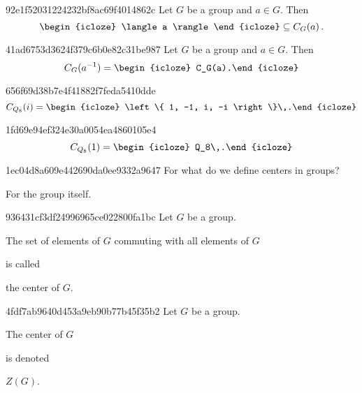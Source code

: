 \begin{note}{92e1f52031224232bf8ac69f4014862c}
    Let \({ G }\) be a group and \({ a \in G }\).
    Then
    \[
        \begin{icloze}{1}\langle a \rangle\end{icloze} \subseteq C_G(a)\,.
    \]
\end{note}

\begin{note}{41ad6753d3624f379c6b0e82c31be987}
    Let \({ G }\) be a group and \({ a \in G }\).
    Then
    \[
        C_G(a^{-1}) = \begin{icloze}{1}C_G(a).\end{icloze}
    \]
\end{note}

\begin{note}{656f69d38b7e4f41882f7feda5410dde}
    \[
        C_{Q_8}(i) = \begin{icloze}{1}\left\{ 1, -1, i, -i \right\}\,.\end{icloze}
    \]
\end{note}

\begin{note}{1fd69e94ef324e30a0054ea4860105e4}
    \[
        C_{Q_8}(1) = \begin{icloze}{1}Q_8\,.\end{icloze}
    \]
\end{note}

\begin{note}{1ec04d8a609e442690da0ee9332a9647}
    For what do we define centers in groups?

    \begin{cloze}{1}
        For the group itself.
    \end{cloze}
\end{note}

\begin{note}{936431cf3df24996965ce022800fa1bc}
    Let \({ G }\) be a group.
    \begin{icloze}{2}The set of elements of \({ G }\) commuting with all elements of \({ G }\)\end{icloze} is called \begin{icloze}{1}the center of \({ G }\).\end{icloze}
\end{note}

\begin{note}{4fdf7ab9640d453a9eb90b77b45f35b2}
    Let \({ G }\) be a group.
    \begin{icloze}{2}The center of \({ G }\)\end{icloze} is denoted \begin{icloze}{1}\({ Z(G) }\).\end{icloze}
\end{note}

